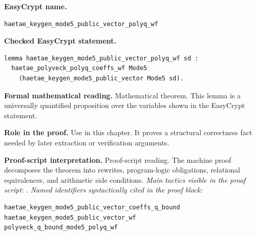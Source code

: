 \begin{formaltheorem}
\noindent\textbf{EasyCrypt name.}
\begin{lstlisting}[language=EasyCrypt,basicstyle=\ttfamily\scriptsize]
haetae_keygen_mode5_public_vector_polyq_wf
\end{lstlisting}
\noindent\textbf{Checked EasyCrypt statement.}
\begin{lstlisting}[language=EasyCrypt,basicstyle=\ttfamily\scriptsize]
lemma haetae_keygen_mode5_public_vector_polyq_wf sd :
  haetae_polyveck_polyq_coeffs_wf Mode5
    (haetae_keygen_mode5_public_vector Mode5 sd).
\end{lstlisting}
\noindent\textbf{Formal mathematical reading.}
Mathematical theorem. This lemma is a universally quantified proposition over the variables shown in the EasyCrypt statement.

\noindent\textbf{Role in the proof.}
Use in this chapter. It proves a structural correctness fact needed by later extraction or verification arguments.

\noindent\textbf{Proof-script interpretation.}
Proof-script reading. The machine proof decomposes the theorem into rewrites, program-logic obligations, relational equivalences, and arithmetic side conditions.
\emph{Main tactics visible in the proof script:} .
\emph{Named identifiers syntactically cited in the proof block:}
\begin{lstlisting}[language=EasyCrypt,basicstyle=\ttfamily\scriptsize]
haetae_keygen_mode5_public_vector_coeffs_q_bound
haetae_keygen_mode5_public_vector_wf
polyveck_q_bound_mode5_polyq_wf
\end{lstlisting}

\end{formaltheorem}

